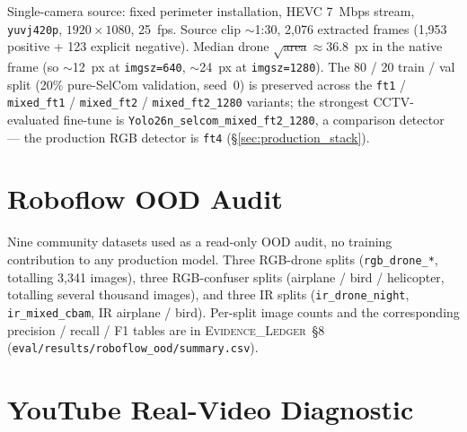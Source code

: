 Single-camera source: fixed perimeter installation, HEVC 7~Mbps stream, \texttt{yuvj420p}, $1920{\times}1080$, 25~fps. Source clip $\sim$1:30, 2{,}076 extracted frames (1{,}953 positive + 123 explicit negative). Median drone $\sqrt{\text{area}} \approx 36.8$~px in the native frame (so $\sim$12~px at \texttt{imgsz=640}, $\sim$24~px at \texttt{imgsz=1280}). The 80 / 20 train / val split (20\% pure-SelCom validation, seed~0) is preserved across the \texttt{ft1} / \texttt{mixed\_ft1} / \texttt{mixed\_ft2} / \texttt{mixed\_ft2\_1280} variants; the strongest CCTV-evaluated fine-tune is \texttt{Yolo26n\_selcom\_mixed\_ft2\_1280}, a comparison detector --- the production RGB detector is \texttt{ft4} (\S\ref{sec:production_stack}).

\section{Roboflow OOD Audit}

Nine community datasets used as a read-only OOD audit, no training contribution to any production model. Three RGB-drone splits (\texttt{rgb\_drone\_*}, totalling 3{,}341 images), three RGB-confuser splits (airplane / bird / helicopter, totalling several thousand images), and three IR splits (\texttt{ir\_drone\_night}, \texttt{ir\_mixed\_cbam}, IR airplane / bird). Per-split image counts and the corresponding precision / recall / F1 tables are in \textsc{Evidence\_Ledger}~\S8 (\texttt{eval/results/roboflow\_ood/summary.csv}).

\section{YouTube Real-Video Diagnostic}

